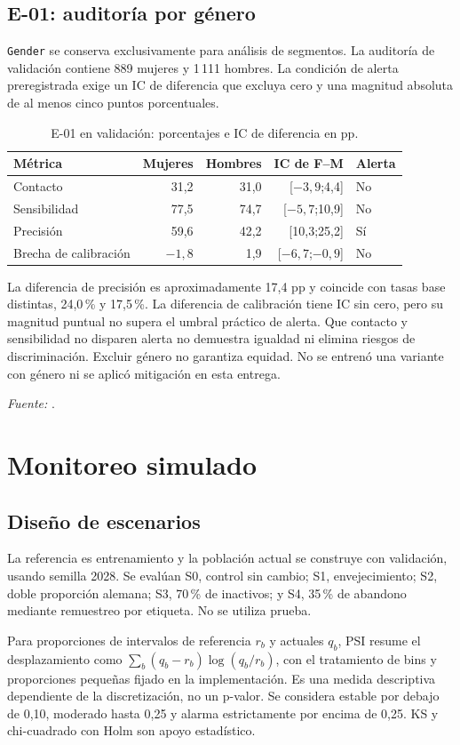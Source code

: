 \documentclass[11pt,a4paper,oneside]{report}
\newcommand{\fuente}[1]{\par{\footnotesize\textit{Fuente:} \path{#1}.}\par}
\begin{document}
\section{E-01: auditoría por género}
\texttt{Gender} se conserva exclusivamente para análisis de segmentos. La
auditoría de validación contiene 889 mujeres y 1\,111 hombres. La condición
de alerta preregistrada exige un IC de diferencia que excluya cero y una
magnitud absoluta de al menos cinco puntos porcentuales.
\begin{table}[htbp]\centering\small
\caption{E-01 en validación: porcentajes e IC de diferencia en pp.}
\begin{tabular}{@{}lrrrl@{}}\toprule
Métrica & Mujeres & Hombres & IC de F--M & Alerta \\\midrule
Contacto & 31,2 & 31,0 & [$-3{,}9$;4,4] & No \\
Sensibilidad & 77,5 & 74,7 & [$-5{,}7$;10,9] & No \\
Precisión & 59,6 & 42,2 & [10,3;25,2] & Sí \\
Brecha de calibración & $-1{,}8$ & 1,9 & [$-6{,}7$;$-0{,}9$] & No \\\bottomrule
\end{tabular}
\end{table}
La diferencia de precisión es aproximadamente 17,4 pp y coincide con tasas
base distintas, 24,0\,\% y 17,5\,\%. La diferencia de calibración tiene IC sin
cero, pero su magnitud puntual no supera el umbral práctico de alerta. Que
contacto y sensibilidad no disparen alerta no demuestra igualdad ni elimina
riesgos de discriminación. Excluir género no garantiza equidad. No se entrenó
una variante con género ni se aplicó mitigación en esta entrega.
\fuente{reports/audit.md}

\chapter{Monitoreo simulado}
\section{Diseño de escenarios}
La referencia es entrenamiento y la población actual se construye con
validación, usando semilla 2028. Se evalúan S0, control sin cambio; S1,
envejecimiento; S2, doble proporción alemana; S3, 70\,\% de inactivos; y S4,
35\,\% de abandono mediante remuestreo por etiqueta. No se utiliza prueba.

Para proporciones de intervalos de referencia $r_b$ y actuales $q_b$, PSI
resume el desplazamiento como $\sum_b(q_b-r_b)\log(q_b/r_b)$, con el tratamiento
de bins y proporciones pequeñas fijado en la implementación. Es una medida
descriptiva dependiente de la discretización, no un p-valor. Se considera estable
por debajo de 0,10, moderado hasta 0,25 y alarma estrictamente por encima de
0,25. KS y chi-cuadrado con Holm son apoyo estadístico.
\end{document}
